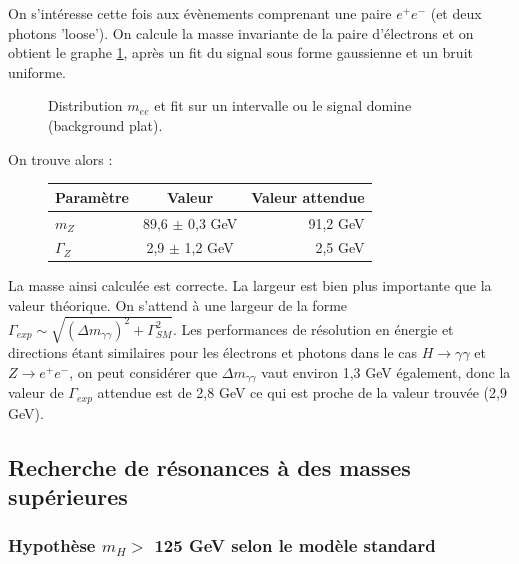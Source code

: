\documentclass[11pt]{article} %
\begin{document}
On s'intéresse cette fois aux évènements comprenant une paire $e^+e^-$ (et deux photons 'loose'). On calcule la masse invariante de la paire d'électrons et on obtient le graphe \ref{fig:distribution_mee}, après un fit du signal sous forme gaussienne et un bruit uniforme. 

\begin{figure}[H]
\centering
  \caption{\label{fig:distribution_mee}Distribution $m_{ee}$ et fit sur un intervalle ou le signal domine (background plat).  }
 \resizebox{.9\linewidth}{!}{}
\end{figure}


On trouve alors :

\begin{figure}[H]
\centering
\begin{tabular}{|l|c|r|} 
   \hline
   Paramètre & Valeur & Valeur attendue \\
    \hline
   $m_Z$ & 89,6 $\pm$ 0,3 GeV & 91,2 GeV\\
  \hline
   $\Gamma_Z$ & 2,9 $\pm$ 1,2 GeV & 2,5 GeV \\
 \hline
\end{tabular}
\end{figure}

La masse ainsi calculée est correcte. La largeur est bien plus importante que la valeur théorique. On s'attend à une largeur de la forme $\Gamma_{exp} \sim \sqrt{(\Delta m_{\gamma \gamma})^2 + \Gamma_{SM}^2}$. Les performances de résolution en énergie et directions étant similaires pour les électrons et photons dans le cas $H \to \gamma \gamma$ et $Z\to e^+e^-$, on peut considérer que $\Delta m_{\gamma \gamma} $ vaut environ 1,3 GeV également, donc la valeur de $\Gamma_{exp}$ attendue est de 2,8 GeV ce qui est proche de la valeur trouvée (2,9 GeV).

\subsection{Recherche de résonances à des masses supérieures }

\subsubsection{Hypothèse $m_H >$ 125 GeV selon le modèle standard}
\end{document}
